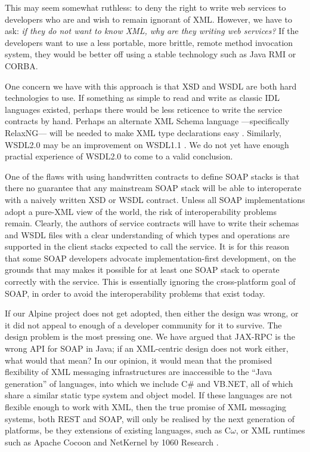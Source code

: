 This may seem somewhat ruthless: to deny the right to write web
services to developers who are and wish to remain ignorant of XML.
However, we have to ask: \emph{if they do not want to know XML, why are
they writing web services?} If the developers want to use a less portable,
more brittle, remote method invocation system, they would be better off
using a stable technology such as Java RMI or CORBA.

One concern we have with this approach is that XSD and WSDL are both hard
technologies to use. If something as simple to read and write as classic IDL
languages existed, perhaps there would be less reticence to write the service
contracts by hand. Perhaps an alternate XML Schema language ---specifically
RelaxNG--- will be needed to make XML type declarations easy
\cite{spec:RelaxNG}. Similarly, WSDL2.0 may be an improvement
on WSDL1.1 \cite{spec:WSDL2.0}. We do not yet have enough practial experience
of WSDL2.0 to come to a valid conclusion.

One of the flaws with using handwritten contracts to define SOAP stacks is
that there no guarantee that any mainstream SOAP stack will be able to
interoperate with a naively written XSD or WSDL contract. Unless all SOAP
implementations adopt a pure-XML view of the world, the risk of interoperability
problems remain. Clearly, the authors of service contracts will have to
write their schemas and WSDL files with a clear understanding of which types and
operations are supported in the client stacks expected to call the service. 
It is for this reason that some SOAP developers advocate implementation-first
development, on the grounds that may makes it possible for at least one SOAP
stack to operate correctly with the service. This is essentially ignoring the
cross-platform goal of SOAP, in order to avoid the interoperability problems
that exist today. 

If our Alpine project does not get adopted, then either the design was wrong,
or it did not appeal to enough of a developer community for it to survive. The
design problem is the most pressing one. We have argued that JAX-RPC is the
wrong API for SOAP in Java; if an XML-centric design does not work either, what
would that mean? In our opinion, it would mean that the promised flexibility of
XML messaging infrastructures are inaccessible to the ``Java generation'' of
languages, into which we include C\# and VB.NET, all of which share a similar
static type system and object model. If these languages are not flexible enough
to work with XML, then the true promise of XML messaging systems, both REST and
SOAP, will only be realised by the next generation of platforms, be they
extensions of existing languages, such as C$\omega$, or XML runtimes such as
Apache Cocoon and NetKernel by 1060 Research
\cite{MSFT:TransitionsInProgrammingModels,pjr:NKonTSS}.
